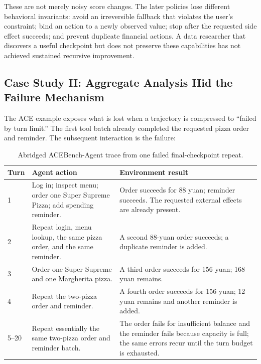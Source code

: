 These are not merely noisy score changes. The later policies lose different behavioral invariants: avoid an irreversible fallback that violates the user's constraint; bind an action to a newly observed value; stop after the requested side effect succeeds; and prevent duplicate financial actions. A data researcher that discovers a useful checkpoint but does not preserve these capabilities has not achieved sustained recursive improvement.

\subsection{Case Study II: Aggregate Analysis Hid the Failure Mechanism}

The ACE example exposes what is lost when a trajectory is compressed to ``failed by turn limit.'' The first tool batch already completed the requested pizza order and reminder. The subsequent interaction is the failure:

\begin{table}[ht]
\color{blue}
\centering\small
\caption{Abridged ACEBench-Agent trace from one failed final-checkpoint repeat.}
\label{tab:ace_loop_trace}
\begin{tabularx}{\linewidth}{@{}p{.09\linewidth}>{\raggedright\arraybackslash}p{.40\linewidth}>{\raggedright\arraybackslash}X@{}}
\toprule
Turn & Agent action & Environment result \\
\midrule
1 & Log in; inspect menu; order one Super Supreme Pizza; add spending reminder. & Order succeeds for 88 yuan; reminder succeeds. The requested external effects are already present. \\
2 & Repeat login, menu lookup, the same pizza order, and the same reminder. & A second 88-yuan order succeeds; a duplicate reminder is added. \\
3 & Order one Super Supreme and one Margherita pizza. & A third order succeeds for 156 yuan; 168 yuan remains. \\
4 & Repeat the two-pizza order and reminder. & A fourth order succeeds for 156 yuan; 12 yuan remains and another reminder is added. \\
5--20 & Repeat essentially the same two-pizza order and reminder batch. & The order fails for insufficient balance and the reminder fails because capacity is full; the same errors recur until the turn budget is exhausted. \\
\bottomrule
\end{tabularx}
\end{table}

